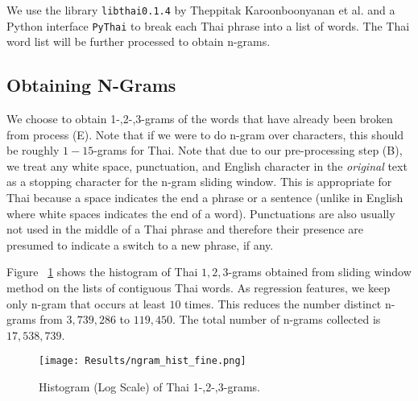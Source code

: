 \documentclass[conference]{IEEEtran}
\begin{document}

We use the library {\tt libthai0.1.4} by Theppitak Karoonboonyanan et al. and a Python interface {\tt PyThai} to break each Thai  phrase into a list of words. The Thai word list will be further processed to obtain n-grams.


\subsection{Obtaining N-Grams}
We choose to obtain 1-,2-,3-grams of the words that have already been broken from process (E). Note that if we were to do n-gram over characters, this should be roughly $1-15$-grams for Thai. Note that due to our pre-processing step (B), we treat any white space, punctuation, and English character in the \emph{original} text as a stopping character for the n-gram sliding window.  %
This is appropriate for Thai because a space indicates the end a phrase or a sentence (unlike in English where white spaces indicates the end of a word). Punctuations are also usually not used in the middle of a Thai phrase and therefore their presence are presumed to indicate a switch to a new phrase, if any.

Figure ~\ref{fig:thaingram_logHist} shows the histogram of Thai $1,2,3$-grams obtained from sliding window method on the lists of contiguous Thai words. As regression features, we keep only n-gram that occurs at least $10$ times. This reduces the number distinct n-grams from $3,739,286$ to $119,450$. The total number of n-grams collected is $17,538,739$.

\begin{figure}[H]
	\centering
	\texttt{[image: Results/ngram\_hist\_fine.png]}
	\caption{Histogram (Log Scale) of Thai 1-,2-,3-grams.}
	\label{fig:thaingram_logHist}
\end{figure}
\end{document}
